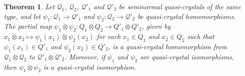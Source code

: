 \documentclass[a4paper,reqno]{amsart}
\numberwithin{equation}{section}
\theoremstyle{plain}
\newtheorem{thm}{Theorem}[section]
\theoremstyle{definition}
\theoremstyle{remark}
\newcommand*{\qcrst}[1]{\mathcal{#1}}
\newcommand*{\qcrstQ}{\qcrst{Q}}
\newcommand*{\dotimes}{\mathbin{\ddot{\otimes}}}  %
\begin{document}
\begin{thm}
\label{thm:qcqtph}
Let $\qcrstQ_1$, $\qcrstQ_2$, $\qcrstQ'_1$ and $\qcrstQ'_2$ be seminormal quasi-crystals of the same type, and let $\psi_1 : \qcrstQ_1 \to \qcrstQ'_1$ and $\psi_2 : \qcrstQ_2 \to \qcrstQ'_2$ be quasi-crystal homomorphisms.
The partial map $\psi_1 \dotimes \psi_2 : Q_1 \dotimes Q_2 \to Q'_1 \dotimes Q'_2$, given by $x_1 \dotimes x_2 \mapsto \psi_1 (x_1) \dotimes \psi_2 (x_2)$ for each $x_1 \in Q_1$ and $x_2 \in Q_2$ such that $\psi_1 (x_1) \in Q'_1$ and $\psi_2 (x_2) \in Q'_2$, is a quasi-crystal homomorphism from $\qcrstQ_1 \dotimes \qcrstQ_2$ to $\qcrstQ'_1 \dotimes \qcrstQ'_2$.
Moreover, if $\psi_1$ and $\psi_2$ are quasi-crystal isomorphisms, then $\psi_1 \dotimes \psi_2$ is a quasi-crystal isomorphism.
\end{thm}
\end{document}

